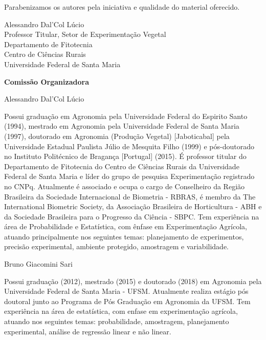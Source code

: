 \documentclass[
]{book}
\numberwithin{equation}{section}
\begin{document}
\setlength{\parindent}{0in}
\noindent

    Parabenizamos os autores pela iniciativa e qualidade do material oferecido.

    \vspace{1.5cm}
    Alessandro Dal'Col Lúcio\\
    Professor Titular, Setor de Experimentação Vegetal\\
    Departamento de Fitotecnia\\
    Centro de Ciências Rurais\\
    Universidade Federal de Santa Maria




\newpage
\thispagestyle{empty}
    \begin{center}
     \textbf{\LARGE
    Comissão Organizadora}
    \end{center}


\LARGE 
Alessandro Dal'Col Lúcio

\normalsize
Possui graduação em Agronomia pela Universidade Federal do Espirito Santo (1994), mestrado em Agronomia pela Universidade Federal de Santa Maria (1997), doutorado em Agronomia (Produção Vegetal) [Jaboticabal] pela Universidade Estadual Paulista Júlio de Mesquita Filho (1999) e pós-doutorado no Instituto Politécnico de Bragança [Portugal] (2015). É professor titular do Departamento de Fitotecnia do Centro de Ciências Rurais da Universidade Federal de Santa Maria e líder do grupo de pesquisa Experimentação registrado no CNPq. Atualmente é associado e ocupa o cargo de Conselheiro da Região Brasileira da Sociedade Internacional de Biometria - RBRAS, é membro da The International Biometric Society, da Associação Brasileira de Horticultura - ABH e da Sociedade Brasileira para o Progresso da Ciência - SBPC. Tem experiência na área de Probabilidade e Estatística, com ênfase em Experimentação Agrícola, atuando principalmente nos seguintes temas: planejamento de experimentos, precisão experimental, ambiente protegido, amostragem e variabilidade.



\vspace{0.5cm}

\LARGE 
Bruno Giacomini Sari

\normalsize
Possui graduação (2012), mestrado (2015) e doutorado (2018) em Agronomia pela Universidade Federal de Santa Maria - UFSM. Atualmente realiza estágio pós doutoral junto ao Programa de Pós Graduação em Agronomia da UFSM. Tem experiência na área de estatística, com enfase em experimentação agrícola, atuando nos seguintes temas: probabilidade, amostragem, planejamento experimental, análise de regressão linear e
não linear. 
\end{document}
